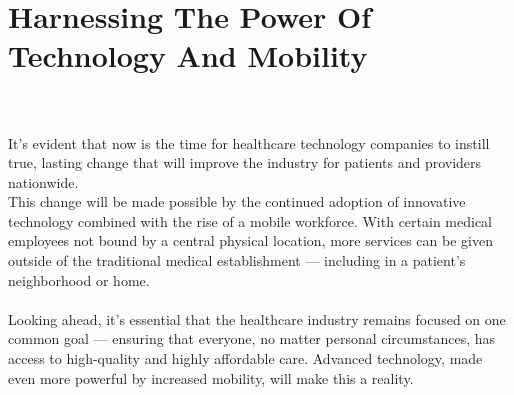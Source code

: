 \documentclass[12pt]{article}
\begin{document}
\section{Harnessing The Power Of Technology And Mobility}
\\
\\
It’s evident that now is the time for healthcare technology companies to instill true, lasting change that will improve the industry for patients and providers nationwide.
\\
This change will be made possible by the continued adoption of innovative technology combined with the rise of a mobile workforce. With certain medical employees not bound by a central physical location, more services can be given outside of the traditional medical establishment — including in a patient’s neighborhood or home.
\\
\\
Looking ahead, it’s essential that the healthcare industry remains focused on one common goal — ensuring that everyone, no matter personal circumstances, has access to high-quality and highly affordable care. Advanced technology, made even more powerful by increased mobility, will make this a reality.
\end{document}
